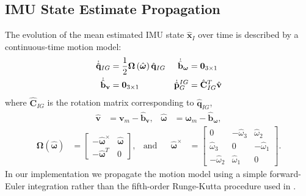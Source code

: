 \documentclass[letterpaper, 10 pt, conference]{ieeeconf}  %
\def\Vec#1{\mathbf{#1}}
\newcommand{\bbm}{\begin{bmatrix}}
\newcommand{\ebm}{\end{bmatrix}}
\begin{document}
\subsection{IMU State Estimate Propagation}
The evolution of the mean estimated IMU state $\hat{\Vec{x}}_I$ over time is described by a continuous-time motion model:
\begin{align}
    \dot{\hat{\Vec{q}}}_{IG} &= \frac{1}{2}\boldsymbol{\Omega}\left(\hat{\boldsymbol{\omega}}\right)\hat{\Vec{q}}_{IG} 
        & \dot{\hat{\Vec{b}}}_{\boldsymbol{\omega}}  &= \Vec{0}_{3\times1} \notag \\
    \dot{\hat{\Vec{b}}}_{\Vec{v}} &= \Vec{0}_{3\times1} 
        & \dot{\hat{\Vec{p}}}^{IG}_G &= \hat{\Vec{C}}_{I G}^T \hat{\Vec{v}}
\end{align}
where $\hat{\Vec{C}}_{I G}$ is the rotation matrix corresponding to $\hat{\Vec{q}}_{IG}$,
\begin{align*}
    \hat{\Vec{v}} &= \Vec{v}_m - \hat{\Vec{b}}_{\Vec{v}}, & \hat{\boldsymbol{\omega}} &= \boldsymbol{\omega}_m - \hat{\Vec{b}}_{\boldsymbol{\omega}},
\end{align*}
\begin{align*}
    \boldsymbol{\Omega}\left(\hat{\boldsymbol{\omega}}\right) &= \bbm -\hat{\boldsymbol{\omega}}^\times & \hat{\boldsymbol{\omega}} \\
                                                                -\hat{\boldsymbol{\omega}}^T & 0
                                                            \ebm ,
                                                            & \text{and} &&
    \hat{\boldsymbol{\omega}}^\times &=   \bbm    0 & -\hat{\omega}_3 & \hat{\omega}_2 \\
                                                \hat{\omega}_3 & 0 & -\hat{\omega}_1 \\
                                                -\hat{\omega}_2 & \hat{\omega}_1 & 0
                                            \ebm .
\end{align*}
In our implementation we propagate the motion model using a simple forward-Euler integration rather than the fifth-order Runge-Kutta procedure used in \cite{Mourikis:2007:ICRA}.
\end{document}
